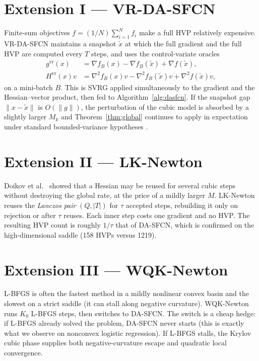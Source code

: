 \documentclass[11pt,a4paper]{article}
\theoremstyle{definition}
\begin{document}
\section{Extension I --- VR-DA-SFCN}
Finite-sum objectives $f=(1/N)\sum_{i=1}^N f_i$ make a full HVP relatively
expensive. VR-DA-SFCN maintains a snapshot $\tilde x$ at which the full
gradient and the full HVP are computed every $T$ steps, and uses the
control-variate oracles
\begin{align}
g^{\mathrm{vr}}(x)
&=
\nabla f_B(x)-\nabla f_B(\tilde x)+\nabla f(\tilde x),\\
H^{\mathrm{vr}}(x)v
&=
\nabla^2 f_B(x)v-\nabla^2 f_B(\tilde x)v+\nabla^2 f(\tilde x)v,
\end{align}
on a mini-batch $B$. This is SVRG \cite{johnson2013} applied simultaneously
to the gradient and the Hessian--vector product, then fed to Algorithm~\ref{alg:dasfcn}.
If the snapshot gap $\|x-\tilde x\|$ is $O(\|g\|)$, the perturbation of the
cubic model is absorbed by a slightly larger $M_k$ and Theorem~\ref{thm:global}
continues to apply in expectation under standard bounded-variance hypotheses
\cite{tripuraneni2018,pasechnyuk2025}.

\section{Extension II --- LK-Newton}
Doikov et al.\ \cite{doikov2023} showed that a Hessian may be reused for
several cubic steps without destroying the global rate, at the price of a
mildly larger $M$. LK-Newton reuses the \emph{Lanczos pair} $(Q,|T|)$ for
$\tau$ accepted steps, rebuilding it only on rejection or after $\tau$
reuses. Each inner step costs one gradient and no HVP. The resulting HVP
count is roughly $1/\tau$ that of DA-SFCN, which is confirmed on the
high-dimensional saddle (158 HVPs versus 1219).

\section{Extension III --- WQK-Newton}
L-BFGS is often the fastest method in a mildly nonlinear convex basin and
the slowest on a strict saddle (it can stall along negative curvature).
WQK-Newton runs $K_0$ L-BFGS steps, then switches to DA-SFCN.
The switch is a cheap hedge: if L-BFGS already solved the problem, DA-SFCN
never starts (this is exactly what we observe on nonconvex logistic
regression). If L-BFGS stalls, the Krylov cubic phase supplies both
negative-curvature escape and quadratic local convergence.
\end{document}
